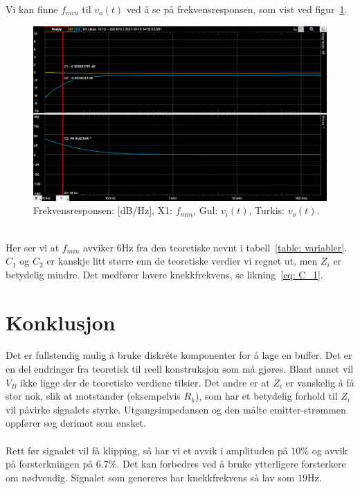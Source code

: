 \documentclass[a4paper,11pt,norsk]{article}
\begin{document}
Vi kan finne $f_{min}$ til $v_o(t)$ ved å se på frekvensresponsen, som vist ved figur~\ref{fig: knekkfrekvens}.
\newpage
\begin{figure}[htbp]
    \centering
    \includegraphics[width=1.0\textwidth]{img/Knekkfrekvens.png}
    \caption{Frekvensresponsen: [dB/Hz], X1: $f_{min}$, Gul: $v_i(t)$, Turkis: $v_o(t)$.}
    \label{fig: knekkfrekvens}
\end{figure}\\
Her ser vi at $f_{min}$ avviker $6$Hz fra den teoretiske nevnt i tabell~\ref{table: variabler}. $C_1$ og $C_2$ er kanskje litt større enn de teoretiske verdier vi regnet ut, men $Z_i$ er betydelig mindre. Det medfører lavere knekkfrekvens, se likning~\ref{eq: C_1}.
\newpage
\section{Konklusjon}
\label{sec:konklusjon}
Det er fullstendig mulig å bruke diskréte komponenter for å lage en buffer. Det er en del endringer fra teoretisk til reell konstruksjon som må gjøres. Blant annet vil $V_B$ ikke ligge der de teoretiske verdiene tilsier. Det andre er at $Z_i$ er vanskelig å få stor nok, slik at motstander (eksempelvis $R_k$), som har et betydelig forhold til $Z_i$ vil påvirke signalets styrke. Utgangsimpedansen og den målte emitter-strømmen oppfører seg derimot som ønsket. 
\\\\
Rett før signalet vil få klipping, så har vi et avvik i amplituden på $10\%$ og avvik på forsterkningen på $6.7\%$. Det kan forbedres ved å bruke ytterligere forsterkere om nødvendig. Signalet som genereres har knekkfrekvens så lav som $19$Hz.
\newpage
\end{document}
